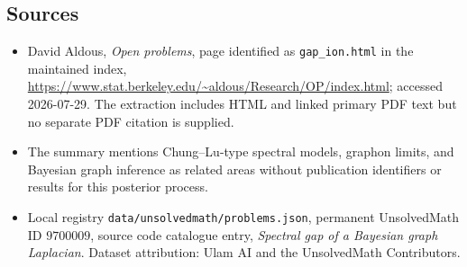 \documentclass[11pt]{article}
\begin{document}
\subsection{Sources}
\begin{itemize}
\item David Aldous, \emph{Open problems}, page identified as \texttt{gap\_ion.html} in the maintained index, \url{https://www.stat.berkeley.edu/~aldous/Research/OP/index.html}; accessed 2026-07-29. The extraction includes HTML and linked primary PDF text but no separate PDF citation is supplied.
\item The summary mentions Chung--Lu-type spectral models, graphon limits, and Bayesian graph inference as related areas without publication identifiers or results for this posterior process.
\item Local registry \texttt{data/unsolvedmath/problems.json}, permanent UnsolvedMath ID $9700009$, source code catalogue entry, \emph{Spectral gap of a Bayesian graph Laplacian}. Dataset attribution: Ulam AI and the UnsolvedMath Contributors.
\end{itemize}
\end{document}
